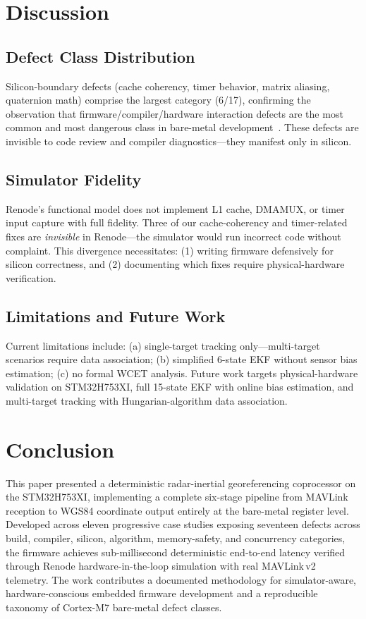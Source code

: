 \documentclass[conference,a4paper]{IEEEtran}
\begin{document}
\section{Discussion}
\label{sec:discussion}

\subsection{Defect Class Distribution}

Silicon-boundary defects (cache coherency, timer behavior, matrix aliasing, quaternion math) comprise the largest category (6/17), confirming the observation that firmware/compiler/hardware interaction defects are the most common and most dangerous class in bare-metal development~\cite{barr2006}. These defects are invisible to code review and compiler diagnostics---they manifest only in silicon.

\subsection{Simulator Fidelity}

Renode's functional model does not implement L1 cache, DMAMUX, or timer input capture with full fidelity. Three of our cache-coherency and timer-related fixes are \emph{invisible} in Renode---the simulator would run incorrect code without complaint. This divergence necessitates: (1) writing firmware defensively for silicon correctness, and (2) documenting which fixes require physical-hardware verification.

\subsection{Limitations and Future Work}

Current limitations include: (a) single-target tracking only---multi-target scenarios require data association; (b) simplified 6-state EKF without sensor bias estimation; (c) no formal WCET analysis. Future work targets physical-hardware validation on STM32H753XI, full 15-state EKF with online bias estimation, and multi-target tracking with Hungarian-algorithm data association.

\section{Conclusion}
\label{sec:conclusion}

This paper presented a deterministic radar-inertial georeferencing coprocessor on the STM32H753XI, implementing a complete six-stage pipeline from MAVLink reception to WGS84 coordinate output entirely at the bare-metal register level. Developed across eleven progressive case studies exposing seventeen defects across build, compiler, silicon, algorithm, memory-safety, and concurrency categories, the firmware achieves sub-millisecond deterministic end-to-end latency verified through Renode hardware-in-the-loop simulation with real MAVLink\,v2 telemetry. The work contributes a documented methodology for simulator-aware, hardware-conscious embedded firmware development and a reproducible taxonomy of Cortex-M7 bare-metal defect classes.
\end{document}
